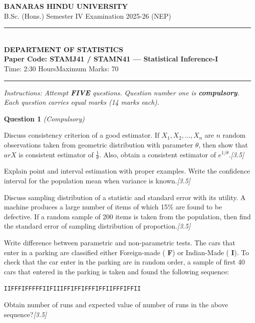 \documentclass[11pt,a4paper]{article}
\newcommand{\pts}[1]{\hfill   \textit{[#1]}}
\begin{document}
\begin{center}
  {\large\bfseries BANARAS HINDU UNIVERSITY}\\[2pt]
  {\normalsize B.Sc. (Hons.) Semester IV Examination 2025-26 (NEP)}\\[6pt]
  \rule{0.8\linewidth}{0.5pt}\\[6pt]
  {\large\bfseries DEPARTMENT OF STATISTICS}\\[4pt]
  {\large\bfseries Paper Code: STAMJ41 / STAMN41 --- Statistical Inference-I}\\[4pt]
  {\normalsize Time: 2:30 Hours\hfill Maximum Marks: 70}
\end{center}

\rule{\linewidth}{0.4pt}\smallskip



\noindent   \textit{Instructions: Attempt   \textbf{FIVE} questions. Question number one is   \textbf{compulsory}. Each question carries equal marks (14 marks each).}
\bigskip




\noindent   \textbf{Question 1}   \textit{(Compulsory)}

\begin{parts}
  \item Discuss consistency criterion of a good estimator. If $X_1, X_2, \dots, X_n$ are $n$ random observations taken from geometric distribution with parameter $ \theta$, then show that $ar{X}$ is consistent estimator of $\frac{1}{ \theta}$. Also, obtain a consistent estimator of $e^{1/ \theta}$.\pts{3.5}
  \item Explain point and interval estimation with proper examples. Write the confidence interval for the population mean when variance is known.\pts{3.5}
  \item Discuss sampling distribution of a statistic and standard error with its utility. A machine produces a large number of items of which 15\% are found to be defective. If a random sample of 200 items is taken from the population, then find the standard error of sampling distribution of proportion.\pts{3.5}
  \item Write difference between parametric and non-parametric tests. The cars that enter in a parking are classified either Foreign-made (   \textbf{F}) or Indian-Made (   \textbf{I}). To check that the car enter in the parking are in random order, a sample of first 40 cars that entered in the parking is taken and found the following sequence:
  
\begin{center}
   \texttt{IIFFFIFFFFFIIFIIIFFIFFIFFFIFFIIFFFIFFII}
  \end{center}
  Obtain number of runs and expected value of number of runs in the above sequence?\pts{3.5}
\end{parts}
\end{document}
